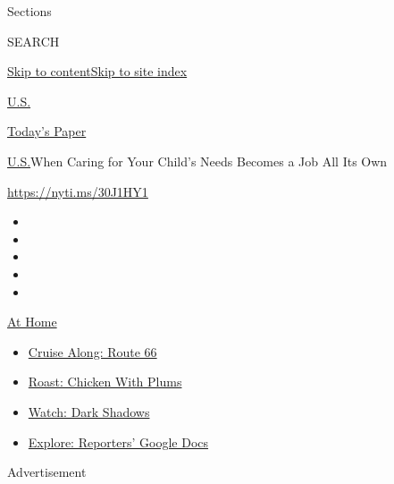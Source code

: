 Sections

SEARCH

\protect\hyperlink{site-content}{Skip to
content}\protect\hyperlink{site-index}{Skip to site index}

\href{https://www.nytimes3xbfgragh.onion/section/us}{U.S.}

\href{https://myaccount.nytimes3xbfgragh.onion/auth/login?response_type=cookie\&client_id=vi}{}

\href{https://www.nytimes3xbfgragh.onion/section/todayspaper}{Today's
Paper}

\href{/section/us}{U.S.}\textbar{}When Caring for Your Child's Needs
Becomes a Job All Its Own

\url{https://nyti.ms/30J1HY1}

\begin{itemize}
\item
\item
\item
\item
\item
\end{itemize}

\href{https://www.nytimes3xbfgragh.onion/spotlight/at-home?action=click\&pgtype=Article\&state=default\&region=TOP_BANNER\&context=at_home_menu}{At
Home}

\begin{itemize}
\tightlist
\item
  \href{https://www.nytimes3xbfgragh.onion/2020/09/07/travel/route-66.html?action=click\&pgtype=Article\&state=default\&region=TOP_BANNER\&context=at_home_menu}{Cruise
  Along: Route 66}
\item
  \href{https://www.nytimes3xbfgragh.onion/2020/09/04/dining/sheet-pan-chicken.html?action=click\&pgtype=Article\&state=default\&region=TOP_BANNER\&context=at_home_menu}{Roast:
  Chicken With Plums}
\item
  \href{https://www.nytimes3xbfgragh.onion/2020/09/04/arts/television/dark-shadows-stream.html?action=click\&pgtype=Article\&state=default\&region=TOP_BANNER\&context=at_home_menu}{Watch:
  Dark Shadows}
\item
  \href{https://www.nytimes3xbfgragh.onion/interactive/2020/at-home/even-more-reporters-editors-diaries-lists-recommendations.html?action=click\&pgtype=Article\&state=default\&region=TOP_BANNER\&context=at_home_menu}{Explore:
  Reporters' Google Docs}
\end{itemize}

Advertisement

